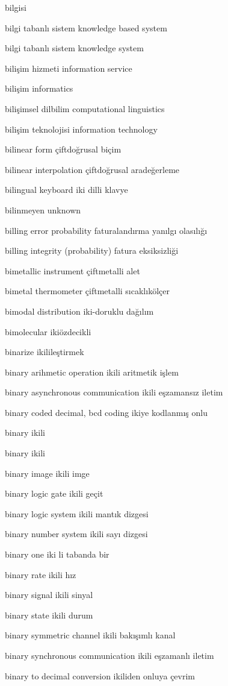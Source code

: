 \documentclass[12pt,fleqn]{article}\usepackage{../../common}
\begin{document}
bilgisi

bilgi tabanlı sistem knowledge based system

bilgi tabanlı sistem knowledge system

bilişim hizmeti information service

bilişim informatics

bilişimsel dilbilim computational linguistics

bilişim teknolojisi information technology

bilinear form çiftdoğrusal biçim

bilinear interpolation çiftdoğrusal aradeğerleme

bilingual keyboard iki dilli klavye

bilinmeyen unknown

billing error probability faturalandırma yanılgı olasılığı

billing integrity (probability) fatura eksiksizliği

bimetallic instrument çiftmetalli alet

bimetal thermometer çiftmetalli sıcaklıkölçer

bimodal distribution iki-doruklu dağılım

bimolecular ikiözdecikli

binarize ikilileştirmek

binary arihmetic operation ikili aritmetik işlem

binary asynchronous communication ikili eşzamansız iletim

binary coded decimal, bcd coding ikiye kodlanmış onlu

binary ikili

binary ikili

binary image ikili imge

binary logic gate ikili geçit

binary logic system ikili mantık dizgesi

binary number system ikili sayı dizgesi

binary one iki li tabanda bir

binary rate ikili hız

binary signal ikili sinyal

binary state ikili durum

binary symmetric channel ikili bakışımlı kanal

binary synchronous communication ikili eşzamanlı iletim

binary to decimal conversion ikiliden onluya çevrim
\end{document}
